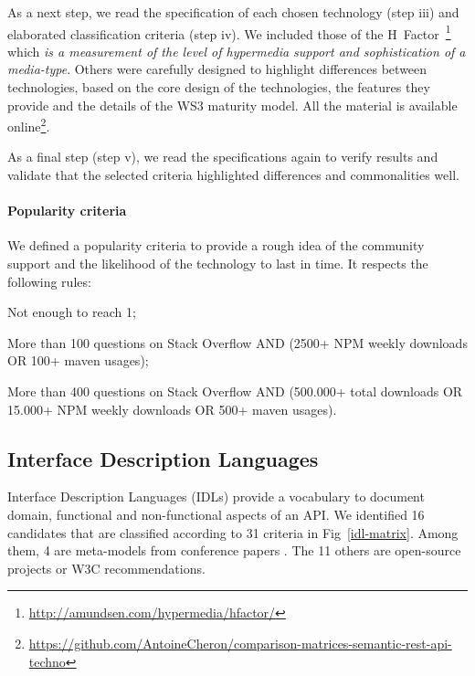 As a next step, we read the specification of each chosen technology (step iii) and elaborated classification criteria (step iv). We included those of the H~Factor~\footnote{\url{http://amundsen.com/hypermedia/hfactor/}} which \textit{is a measurement of the level of hypermedia support and sophistication of a media-type}. Others were carefully designed to highlight differences between technologies, based on the core design of the technologies, the features they provide and the details of the WS3 maturity model. All the material is available online\footnote{\url{https://github.com/AntoineCheron/comparison-matrices-semantic-rest-api-techno}}.

As a final step (step v), we read the specifications again to verify results and validate that the selected criteria highlighted differences and commonalities well.

\paragraph{Popularity criteria}

We defined a popularity criteria to provide a rough idea of the community support and the likelihood of the technology to last in time. It respects the following rules: 
\begin{inparadesc}
    \item [0 -] Not enough to reach 1;
    \item [1 -] More than 100 questions on Stack Overflow AND (2500+ NPM weekly downloads OR 100+ maven usages);
    \item [2 -] More than 400 questions on Stack Overflow AND (500.000+ total downloads OR 15.000+ NPM weekly downloads OR 500+ maven usages).
\end{inparadesc}

\subsection{Interface Description Languages}

Interface Description Languages (IDLs) provide a vocabulary to document domain, functional and non-functional aspects of an API.
We identified 16 candidates that are classified according to 31 criteria in Fig~\ref{idl-matrix}. Among them, 4 are meta-models from conference papers \cite{10.1109/ICWS.2014.30} \cite{Rapido} \cite{Schreier:2011:MRA:1967428.1967434} \cite{10.1007/978-3-642-22233-7_24}. The 11 others are open-source projects or W3C recommendations.

